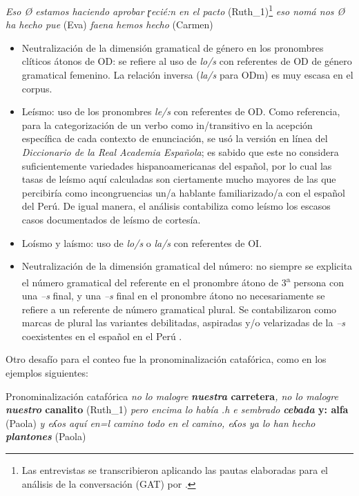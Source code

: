 \documentclass[output=paper]{../langscibook}
\begin{document}
\newpage
\ea\label{ex:mick:1}
\ea\label{ex:mick:1a} \textit{Eso Ø estamos haciendo aprobar ɽecié:n en el pacto} (Ruth\_1)\footnote{Las entrevistas se transcribieron aplicando las pautas elaboradas para el análisis de la conversación (GAT) por \citet{SeltingEtAl1998}.}
\ex\label{ex:mick:1b} \textit{eso nomá nos Ø ha hecho pue} (Eva)
\ex\label{ex:mick:1c} \textit{faena hemos hecho} (Carmen)
\z
\z

\begin{itemize}
\item Neutralización de la dimensión gramatical de género en los pronombres clíticos átonos de OD: se refiere al uso de \textit{lo/s} con referentes de OD de género gramatical femenino. La relación inversa (\textit{la/s} para ODm) es muy escasa en el corpus.
\item Leísmo: uso de los pronombres \textit{le/s} con referentes de OD. Como referencia, para la categorización de un verbo como in/transitivo en la acepción específica de cada contexto de enunciación, se usó la versión en línea del \textit{Diccionario de la Real Academia Española}; es sabido que este no considera suficientemente variedades hispanoamericanas del español, por lo cual las tasas de leísmo aquí calculadas son ciertamente mucho mayores de las que percibiría como incongruencias un/a hablante familiarizado/a con el español del Perú. De igual manera, el análisis contabiliza como leísmo los escasos casos documentados de leísmo de cortesía.
\item Loísmo y laísmo: uso de \textit{lo/s} o \textit{la/s} con referentes de OI.
\item Neutralización de la dimensión gramatical del número: no siempre se explicita el número gramatical del referente en el pronombre átono de 3\textsuperscript{a} persona con una \textit{--s} final, y una \textit{--s} final en el pronombre átono no necesariamente se refiere a un referente de número gramatical plural. Se contabilizaron como marcas de plural las variantes debilitadas, aspiradas y/o velarizadas de la \textit{--s} coexistentes en el español en el Perú \citep{Caravedo1990}.
\end{itemize}

Otro desafío para el conteo fue la pronominalización catafórica, como en los ejemplos siguientes:


\ea Pronominalización catafórica\label{ex:mick:2}
\ea\label{ex:mick:2a} \textit{no lo malogre} \textbf{\textit{nuestra} \textbf{carretera}}\textit{, no lo malogre} \textbf{\textit{nuestro} \textbf{canalito}} (Ruth\_1)
\ex\label{ex:mick:2b} \textit{pero encima lo había .h e sembrado} \textbf{\textit{cebada} \textbf{y:} \textbf{alfa}} (Paola)
\ex\label{ex:mick:2c} \textit{y eʎos aquí en=l camino todo en el camino, eʎos ya lo han hecho} \textbf{\textit{plantones}} (Paola)
\z
\z
\end{document}
